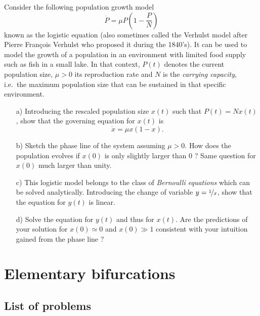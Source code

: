\bigskip

\begin{problem}
  Consider the following population growth model
  \[
  \dot{P} = \mu P \left( 1 - \dfrac{P}{N} \right)
  \]
  known as the logistic equation (also sometimes called the Verhulst model after Pierre François Verhulst who proposed it during the 1840's).
  It can be used to model the growth of a population in an environment with limited food supply such as fish in a small lake.
  In that context, $P(t)$ denotes the current population size, $\mu > 0$ its reproduction rate and $N$ is the \emph{carrying capacity}, i.e.\ the maximum population size that can be sustained in that specific environment.

  \bigskip

  \begin{enumerate}
  \item[a)] Introducing the rescaled population size $x(t)$ such that $P(t) = N x(t)$, show that the governing equation for $x(t)$ is
    \[
    \dot{x} = \mu x \left( 1 - x \right).
    \]

  \item[b)] Sketch the phase line of the system assuming $\mu > 0$.
    How does the population evolves if $x(0)$ is only slightly larger than 0 ?
    Same question for $x(0)$ much larger than unity.

  \item[c)] This logistic model belongs to the class of \emph{Bernoulli equations} which can be solved analytically.
    Introducing the change of variable $y = \nicefrac{1}{x}$, show that the equation for $y(t)$ is linear.

  \item[d)] Solve the equation for $y(t)$ and thus for $x(t)$.
    Are the predictions of your solution for $x(0) \simeq 0$ and $x(0) \gg 1$ consistent with your intuition gained from the phase line ?
  \end{enumerate}
\end{problem}

\section{Elementary bifurcations}\label{sec: elementary bifurcations}

\subsection{List of problems}

